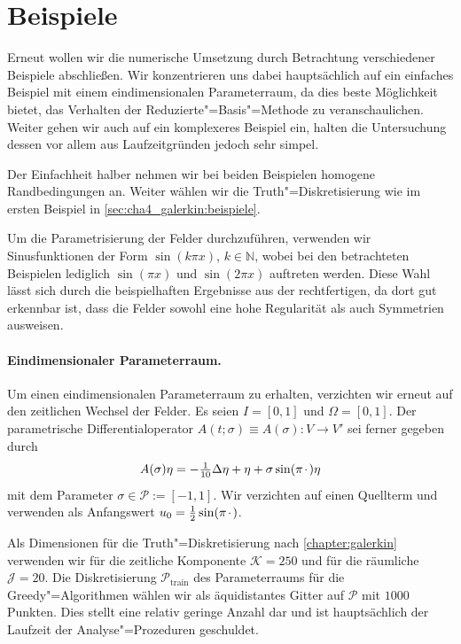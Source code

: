 \documentclass[../main.tex]{subfiles}
\begin{document}
\section{Beispiele} %
\label{sec:cha5_rbm:beispiele}

Erneut wollen wir die numerische Umsetzung durch Betrachtung verschiedener Beispiele abschließen.
Wir konzentrieren uns dabei hauptsächlich auf ein einfaches Beispiel mit einem eindimensionalen Parameterraum, da dies beste Möglichkeit bietet, das Verhalten der Reduzierte"=Basis"=Methode zu veranschaulichen.
Weiter gehen wir auch auf ein komplexeres Beispiel ein, halten die Untersuchung dessen vor allem aus Laufzeitgründen jedoch sehr simpel.

Der Einfachheit halber nehmen wir bei beiden Beispielen homogene Randbedingungen an.
Weiter wählen wir die Truth"=Diskretisierung wie im ersten Beispiel in \cref{sec:cha4_galerkin:beispiele}.

Um die Parametrisierung der Felder durchzuführen, verwenden wir Sinusfunktionen der Form $\sin(k \pi x)$, $k \in \mathbb{N}$, wobei bei den betrachteten Beispielen lediglich $\sin(\pi x)$ und $\sin(2 \pi x)$ auftreten werden.
Diese Wahl lässt sich durch die beispielhaften Ergebnisse aus der  rechtfertigen, da dort gut erkennbar ist, dass die Felder sowohl eine hohe Regularität als auch Symmetrien ausweisen.

\paragraph{Eindimensionaler Parameterraum.} %

Um einen eindimensionalen Parameterraum zu erhalten, verzichten wir erneut auf den zeitlichen Wechsel der Felder.
Es seien $I = [0, 1]$ und $\Omega = [0, 1]$.
Der parametrische Differentialoperator $A(t; \sigma) \equiv A(\sigma) \colon V \to V'$ sei ferner gegeben durch
\begin{equation}
    A(\sigma) \eta = - \tfrac{1}{10} \Delta \eta + \eta + \sigma \sin(\pi {\mkern2mu\cdot\mkern2mu}) \eta
\end{equation}
mit dem Parameter $\sigma \in \mathcal P := [-1, 1]$.
Wir verzichten auf einen Quellterm und verwenden als Anfangswert $u_{0} = \tfrac{1}{2} \sin(\pi {\mkern2mu\cdot\mkern2mu})$.

Als Dimensionen für die Truth"=Diskretisierung nach \cref{chapter:galerkin} verwenden wir für die zeitliche Komponente $\mathcal K = 250$ und für die räumliche $\mathcal J = 20$.
Die Diskretisierung $\mathcal P_{\mathrm{train}}$ des Parameterraums für die Greedy"=Algorithmen wählen wir als äquidistantes Gitter auf $\mathcal P$ mit $1000$ Punkten.
Dies stellt eine relativ geringe Anzahl dar und ist hauptsächlich der Laufzeit der Analyse"=Prozeduren geschuldet.
\end{document}
